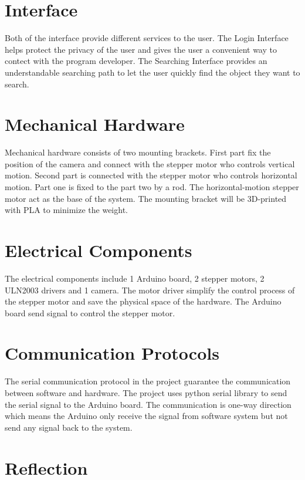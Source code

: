 \documentclass[12pt, titlepage]{article}
\begin{document}
% 

\newpage{}

\appendix

\section{Interface}

Both of the interface provide different services to the user. The Login Interface helps protect the privacy of the user and gives the user a convenient way to contect with the program developer. The Searching Interface provides an understandable searching path to let the user quickly find the object they want to search. 

\section{Mechanical Hardware}
Mechanical hardware consists of two mounting brackets. First part fix the position of the camera and connect with the stepper motor who controls vertical motion. Second part is connected with the stepper motor who controls horizontal motion. Part one is fixed to the part two by a rod. The horizontal-motion stepper motor act as the base of the system. The mounting bracket will be 3D-printed with PLA to minimize the weight.

\section{Electrical Components}
The electrical components include 1 Arduino board, 2 stepper motors, 2 ULN2003 drivers and 1 camera. The motor driver simplify the control process of the stepper motor and save the physical space of the hardware. The Arduino board send signal to control the stepper motor.
\section{Communication Protocols}
The serial communication protocol in the project guarantee the communication between software and hardware. The project uses python serial library to send the serial signal to the Arduino board. The communication is one-way direction which means the Arduino only receive the signal from software system but not send any signal back to the system.
\section{Reflection}
\end{document}
